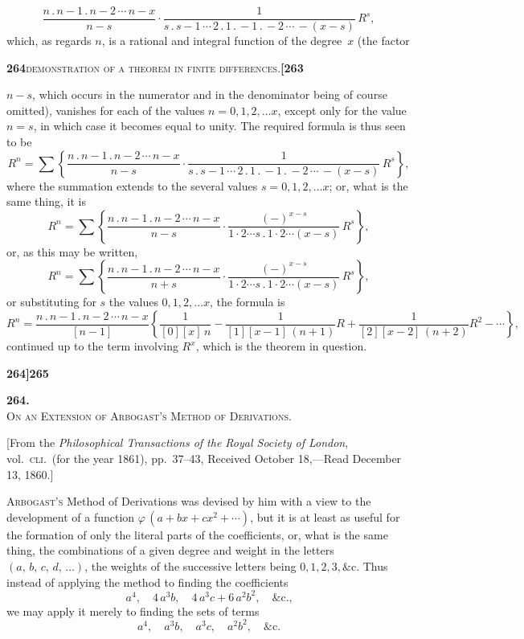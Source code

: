 \documentclass[11pt]{article}
\begin{document}
\[
   \frac{n\,.\,n-1\,.\,n-2\,\cdots\,n-x}{n - s}\cdot\frac{1}{s\,.\,s-1\,\cdots\,2\,.\,1\,.\,-1\,.\,-2\,\cdots\,-(x - s)}\,R^s,
\]
which, as regards $n$, is a rational and integral function of the degree~$x$ (the factor

\newpage
\setcounter{page}{264}

\noindent\textbf{264}\hfill\textsc{demonstration of a theorem in finite differences.}\hfill\textbf{[263}

\medskip

\noindent $n - s$, which occurs in the numerator and in the denominator being of course omitted), vanishes for each of the values $n = 0, 1, 2, \ldots x$, except only for the value $n = s$, in which case it becomes equal to unity. The required formula is thus seen to be
\[
   R^n = \sum\left\{\frac{n\,.\,n-1\,.\,n-2\,\cdots\,n-x}{n - s}\cdot\frac{1}{s\,.\,s-1\,\cdots\,2\,.\,1\,.\,-1\,.\,-2\,\cdots\,-(x - s)}\,R^s\right\},
\]
where the summation extends to the several values $s = 0, 1, 2, \ldots x$; or, what is the same thing, it is
\[
   R^n = \sum\left\{\frac{n\,.\,n-1\,.\,n-2\,\cdots\,n-x}{n - s}\cdot\frac{(-)^{x-s}}{1\cdot 2\cdots s\,.\,1\cdot 2\cdots(x - s)}\,R^s\right\},
\]
or, as this may be written,
\[
   R^n = \sum\left\{\frac{n\,.\,n-1\,.\,n-2\,\cdots\,n-x}{n + s}\cdot\frac{(-)^{x-s}}{1\cdot 2\cdots s\,.\,1\cdot 2\cdots(x - s)}\,R^s\right\},
\]
or substituting for $s$ the values $0, 1, 2, \ldots x$, the formula is
\[
   R^n = \frac{n\,.\,n-1\,.\,n-2\,\cdots\,n-x}{[n-1]}\left\{\frac{1}{[0][x]\,n} - \frac{1}{[1][x-1]\,(n+1)} R + \frac{1}{[2][x-2]\,(n+2)} R^2 - \cdots\right\},
\]
continued up to the term involving $R^x$, which is the theorem in question.

\newpage
\setcounter{page}{265}

\noindent\textbf{264]}\hfill\textbf{265}

\bigskip

\begin{center}
{\large\textbf{264.}}\\[0.6em]
{\large\textsc{On an Extension of Arbogast's Method of Derivations.}}
\end{center}

\medskip

\noindent\small[From the \textit{Philosophical Transactions of the Royal Society of London}, vol.~\textsc{cli.}\ (for the year 1861), pp.~37--43, Received October 18,---Read December 13, 1860.]\normalsize

\medskip

\noindent\textsc{Arbogast's} Method of Derivations was devised by him with a view to the development of a function $\varphi\,(a + b x + c x^2 + \cdots)$, but it is at least as useful for the formation of only the literal parts of the coefficients, or, what is the same thing, the combinations of a given degree and weight in the letters $(a,\,b,\,c,\,d,\,\ldots)$, the weights of the successive letters being $0, 1, 2, 3, \&\text{c.}$ Thus instead of applying the method to finding the coefficients
\[
   a^4,\quad 4\,a^3 b,\quad 4\,a^3 c + 6\,a^2 b^2,\quad \&\text{c.,}
\]
we may apply it merely to finding the sets of terms
\[
   a^4,\quad a^3 b,\quad a^3 c,\quad a^2 b^2,\quad \&\text{c.}
\]
\end{document}
